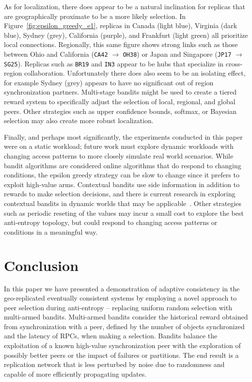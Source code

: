 As for localization, there does appear to be a natural inclination for
replicas that are geographically proximate to be a more likely selection.
In Figure~\ref{fig:epsilon_greedy_e1}, replicas in Canada (light blue),
Virginia (dark blue), Sydney (grey), California (purple), and Frankfurt
(light green) all prioritize local connections.
Regionally, this same figure shows strong links such as those between Ohio
and California (\texttt{CA42} $\rightarrow$ \texttt{OH38}) or Japan and
Singapore (\texttt{JP17} $\rightarrow$ \texttt{SG25}).
Replicas such as \texttt{BR19} and \texttt{IN3} appear to be hubs that
specialize in cross-region collaboration.
Unfortunately there does also seem to be an isolating effect, for example
Sydney (grey) appears to have no significant out of region synchronization
partners.
Multi-stage bandits might be used to create a tiered reward system to
specifically adjust the selection of local, regional, and global peers.
Other strategies such as upper confidence bounds, softmax, or Bayesian
selection may also create more robust localization.

Finally, and perhaps most significantly, the experiments conducted in
this paper were on a static workload; future work must explore dynamic
workloads with changing access patterns to more closely simulate real
world scenarios.
While bandit algorithms are considered online algorithms that do respond
to changing conditions, the epsilon greedy strategy can be slow to change
since it prefers to exploit high-value arms.
Contextual bandits use side information in addition to rewards to make
selection decisions, and there is current research in exploring contextual
bandits in dynamic worlds that may be applicable~\cite{luo_efficient_2017}.
Other strategies such as periodic reseting of the values may incur a small
cost to explore the best anti-entropy topology, but could respond to changing
access patterns or conditions in a meaningful way.

\section*{Conclusion}

In this paper we have presented a demonstration of adaptive consistency in
the geo-replicated eventually consistent systems by employing a novel
approach to peer selection during anti-entropy -- replacing uniform random
selection with multi-armed bandits.
Multi-armed bandits consider the historical reward obtained from
synchronization with a peer, defined by the number of objects synchronized
and the latency of RPCs, when making a selection.
Bandits balance the exploitation of a known high-value synchronization
peer with the exploration of possibly better peers or the impact of
failures or partitions.
The end result is a replication network that is less perturbed by noise
due to randomness and capable of more efficiently propagating updates.

